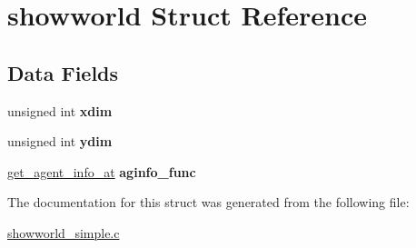 \hypertarget{structshowworld}{}\section{showworld Struct Reference}
\label{structshowworld}
\subsection*{Data Fields}
\begin{DoxyCompactItemize}
\item 
\mbox{\label{structshowworld_a13ccb48c2d0f4bf22feb3b79d1a59cd1}} 
unsigned int {\bfseries xdim}
\item 
\mbox{\label{structshowworld_acd5145dde85bed8b6ecaffcaa286d16b}} 
unsigned int {\bfseries ydim}
\item 
\mbox{\label{structshowworld_ace712a32ac03fe3ba418465fbad4f536}} 
\mbox{\hyperlink{showworld_8h_aa7881dde0e99af6e6576a7401f3c4586}{get\+\_\+agent\+\_\+info\+\_\+at}} {\bfseries aginfo\+\_\+func}
\end{DoxyCompactItemize}


The documentation for this struct was generated from the following file\+:\begin{DoxyCompactItemize}
\item 
\mbox{\hyperlink{showworld__simple_8c}{showworld\+\_\+simple.\+c}}\end{DoxyCompactItemize}
